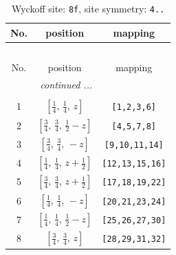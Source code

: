 \documentclass[fleqn,8pt]{jsarticle}
\begin{document}
\begin{longtable}{ccc}
\caption{Wyckoff site: {\tt 8f}, site symmetry: {\tt 4..}}
 \\
 \hline \hline
No. & position & mapping \\ \hline \endfirsthead

\multicolumn{2}{l}{\tablename\ \thetable{}} \\
 \hline \hline
No. & position & mapping \\ \hline \endhead

 \hline \hline
\multicolumn{2}{r}{\footnotesize\it continued ...} \\ \endfoot

 \hline \hline
\multicolumn{2}{r}{} \\ \endlastfoot

1 & $\left[ \frac{1}{4},\, \frac{1}{4},\, z \right]$ & {\tt [1,2,3,6]} \\ \hline
2 & $\left[ \frac{3}{4},\, \frac{3}{4},\, \frac{1}{2} - z \right]$ & {\tt [4,5,7,8]} \\ \hline
3 & $\left[ \frac{3}{4},\, \frac{3}{4},\, - z \right]$ & {\tt [9,10,11,14]} \\ \hline
4 & $\left[ \frac{1}{4},\, \frac{1}{4},\, z + \frac{1}{2} \right]$ & {\tt [12,13,15,16]} \\ \hline
5 & $\left[ \frac{3}{4},\, \frac{3}{4},\, z + \frac{1}{2} \right]$ & {\tt [17,18,19,22]} \\ \hline
6 & $\left[ \frac{1}{4},\, \frac{1}{4},\, - z \right]$ & {\tt [20,21,23,24]} \\ \hline
7 & $\left[ \frac{1}{4},\, \frac{1}{4},\, \frac{1}{2} - z \right]$ & {\tt [25,26,27,30]} \\ \hline
8 & $\left[ \frac{3}{4},\, \frac{3}{4},\, z \right]$ & {\tt [28,29,31,32]} \\
\end{longtable}
\renewcommand{\arraystretch}{1.2}
\end{document}
